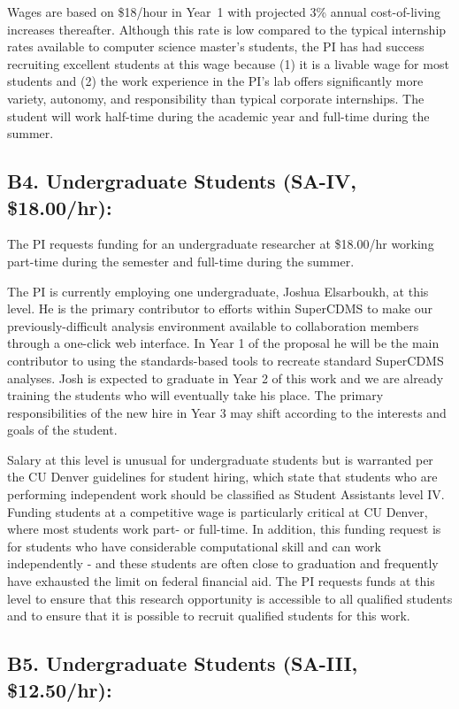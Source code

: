 \documentclass[11pt,oneside]{memoir}
\begin{document}
Wages are based on \$18/hour in Year~1 with projected 3\% annual cost-of-living increases thereafter. Although this rate is low compared to the typical internship rates available to computer science master's students, the PI has had success recruiting excellent students at this wage because (1) it is a livable wage for most students and (2) the work experience in the PI's lab offers significantly more variety, autonomy, and responsibility than typical corporate internships.  The student will work half-time during the academic year and full-time during the summer. 

\subsection{B4. Undergraduate Students (SA-IV, \$18.00/hr):}

The PI requests funding for an undergraduate researcher at \$18.00/hr working part-time during the semester and full-time during the summer.  

The PI is currently employing one undergraduate, Joshua Elsarboukh, at this level. He is the primary contributor to efforts within SuperCDMS to make our previously-difficult analysis environment available to collaboration members through a one-click web interface.  In Year 1 of the proposal he will be the main contributor to using the standards-based tools to recreate standard SuperCDMS analyses.  Josh is expected to graduate in Year 2 of this work and we are already training the students who will eventually take his place.  The primary responsibilities of the new hire in Year 3 may shift according to the interests and goals of the student.

Salary at this level is unusual for undergraduate students but is warranted per the CU Denver guidelines for student hiring, which state that students who are performing independent work should be classified as Student Assistants level IV.  Funding students at a competitive wage is particularly critical at CU Denver, where most students work part- or full-time.  In addition, this funding request is for students who have considerable computational skill and can work independently - and these students are often close to graduation and frequently have exhausted the limit on federal financial aid.  The PI requests funds at this level to ensure that this research opportunity is accessible to all qualified students and to ensure that it is possible to recruit qualified students for this work. 

\subsection{B5. Undergraduate Students (SA-III, \$12.50/hr):}
\end{document}

